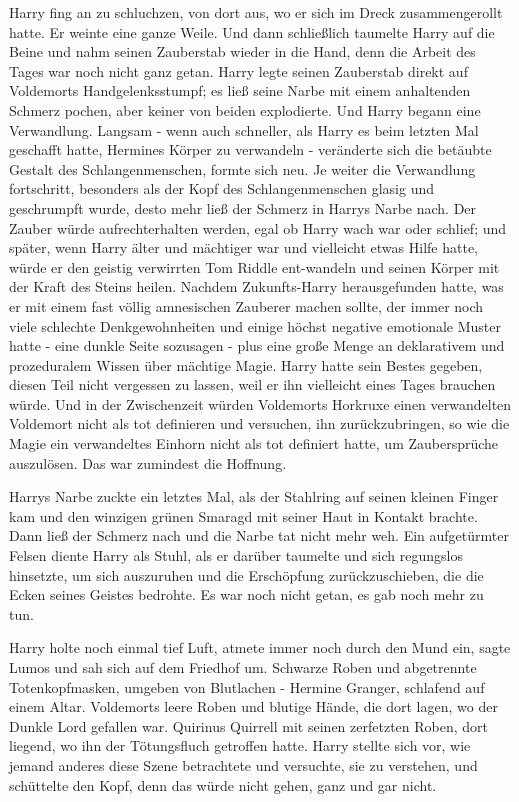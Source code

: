 Harry fing an zu schluchzen, von dort aus, wo er sich im Dreck zusammengerollt
hatte. Er weinte eine ganze Weile. Und dann schließlich taumelte Harry auf die
Beine und nahm seinen Zauberstab wieder in die Hand, denn die Arbeit des Tages
war noch nicht ganz getan. Harry legte seinen Zauberstab direkt auf Voldemorts
Handgelenksstumpf; es ließ seine Narbe mit einem anhaltenden Schmerz pochen,
aber keiner von beiden explodierte. Und Harry begann eine Verwandlung. Langsam -
wenn auch schneller, als Harry es beim letzten Mal geschafft hatte, Hermines
Körper zu verwandeln - veränderte sich die betäubte Gestalt des
Schlangenmenschen, formte sich neu. Je weiter die Verwandlung fortschritt,
besonders als der Kopf des Schlangenmenschen glasig und geschrumpft wurde, desto
mehr ließ der Schmerz in Harrys Narbe nach. Der Zauber würde aufrechterhalten
werden, egal ob Harry wach war oder schlief; und später, wenn Harry älter und
mächtiger war und vielleicht etwas Hilfe hatte, würde er den geistig verwirrten
Tom Riddle ent-wandeln und seinen Körper mit der Kraft des Steins heilen.
Nachdem Zukunfts-Harry herausgefunden hatte, was er mit einem fast völlig
amnesischen Zauberer machen sollte, der immer noch viele schlechte
Denkgewohnheiten und einige höchst negative emotionale Muster hatte - eine
dunkle Seite sozusagen - plus eine große Menge an deklarativem und prozeduralem
Wissen über mächtige Magie. Harry hatte sein Bestes gegeben, diesen Teil nicht
vergessen zu lassen, weil er ihn vielleicht eines Tages brauchen würde. Und in
der Zwischenzeit würden Voldemorts Horkruxe einen verwandelten Voldemort nicht
als tot definieren und versuchen, ihn zurückzubringen, so wie die Magie ein
verwandeltes Einhorn nicht als tot definiert hatte, um Zaubersprüche auszulösen.
Das war zumindest die Hoffnung.

Harrys Narbe zuckte ein letztes Mal, als der Stahlring auf seinen kleinen Finger
kam und den winzigen grünen Smaragd mit seiner Haut in Kontakt brachte. Dann
ließ der Schmerz nach und die Narbe tat nicht mehr weh. Ein aufgetürmter Felsen
diente Harry als Stuhl, als er darüber taumelte und sich regungslos hinsetzte,
um sich auszuruhen und die Erschöpfung zurückzuschieben, die die Ecken seines
Geistes bedrohte. Es war noch nicht getan, es gab noch mehr zu tun.

Harry holte noch einmal tief Luft, atmete immer noch durch den Mund ein, sagte
\glqq Lumos\grqq{} und sah sich auf dem Friedhof um. Schwarze Roben und
abgetrennte Totenkopfmasken, umgeben von Blutlachen - Hermine Granger, schlafend
auf einem Altar. Voldemorts leere Roben und blutige Hände, die dort lagen, wo
der Dunkle Lord gefallen war. Quirinus Quirrell mit seinen zerfetzten Roben,
dort liegend, wo ihn der Tötungsfluch getroffen hatte. Harry stellte sich vor,
wie jemand anderes diese Szene betrachtete und versuchte, sie zu verstehen, und
schüttelte den Kopf, denn das würde nicht gehen, ganz und gar nicht.


